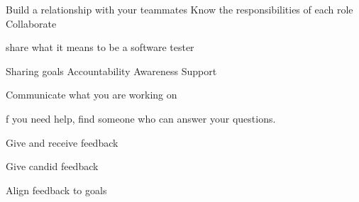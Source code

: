 Build a relationship with your teammates 
Know the responsibilities of each role 
Collaborate

share what it means to be a software tester 

Sharing goals
  Accountability 
  Awareness 
  Support 

Communicate what you are working on 

f you need help, find someone who can answer your questions.

Give and receive feedback

Give candid feedback 

Align feedback to goals 